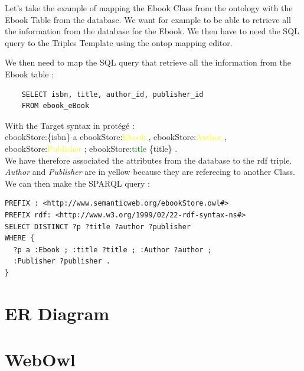 \documentclass[a4paper,12pt]{article}
\begin{document}
Let's take the example of mapping the Ebook Class from the ontology with the Ebook Table from the database. We want for example to be able to retrieve all the information from the database for the Ebook. We then have to need the SQL query to the Triples Template using the ontop mapping editor.

We then need to map the SQL query that retrieve all the information from the Ebook table : 
\begin{lstlisting}
    SELECT isbn, title, author_id, publisher_id
    FROM ebook_eBook
\end{lstlisting}

With the Target syntax in protégé :\\

\noindent ebookStore:\{isbn\} a ebookStore:\textcolor{yellow}{Ebook} , ebookStore:\textcolor{yellow}{Author} , ebookStore:\textcolor{yellow}{Publisher} ; ebookStore:\textcolor{green}{title} \{title\} .\\

We have therefore associated the attributes from the database to the rdf triple. \textit{Author} and \textit{Publisher} are in yellow because they are referecing to another Class. We can then make the SPARQL query : 

\begin{lstlisting}
PREFIX : <http://www.semanticweb.org/ebookStore.owl#>
PREFIX rdf: <http://www.w3.org/1999/02/22-rdf-syntax-ns#>
SELECT DISTINCT ?p ?title ?author ?publisher
WHERE {
  ?p a :Ebook ; :title ?title ; :Author ?author ; 
  :Publisher ?publisher .
}   
\end{lstlisting}

\section{ER Diagram}
\begin{center}
\end{center}
\section{WebOwl}
\begin{center}
\end{center}
\end{document}
